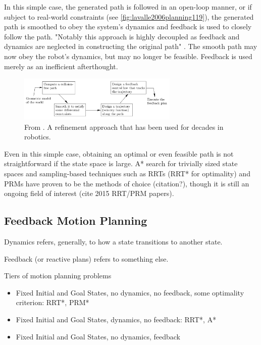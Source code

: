 In this simple case, the generated path is followed in an open-loop manner, or
if subject to real-world constraints (see \autoref{fig:lavalle2006planning119}),
the generated path is smoothed to obey the system's dynamics and feedback is
used to closely follow the path. "Notably this approach is highly decoupled as
feedback and dynamics are neglected in constructing the original path"
\cite{lavalle2006planning}. The smooth path may now obey the robot's dynamics,
but may no longer be feasible.  Feedback is used merely as an inefficient
afterthought.

\begin{figure}
\centering
\includegraphics[width=3in]{figures/lavalle2006planning119.png}
\caption{From \cite{lavalle2006planning}. A refinement approach that has been used for decades in robotics.}
\label{fig:lavalle2006planning119}
\end{figure}

Even in this simple case, obtaining an optimal or even feasible path is not
straightforward if the state space is large. A* search for trivially sized state
spaces and sampling-based techniques such as RRTs (RRT* for optimality) and PRMs
have proven to be the methods of choice (citation?), though it is still an
ongoing field of interest (cite 2015 RRT/PRM papers).

\subsection{Feedback Motion Planning}
Dynamics refers, generally, to how a state transitions to another state.

Feedback (or reactive plans) refers to something else.

Tiers of motion planning problems
\begin{itemize}
\item Fixed Initial and Goal States, no dynamics, no feedback, some optimality
criterion: RRT*, PRM*
\item Fixed Initial and Goal States, dynamics, no feedback: RRT*, A*
\item Fixed Initial and Goal States, no dynamics, feedback
\end{itemize}

